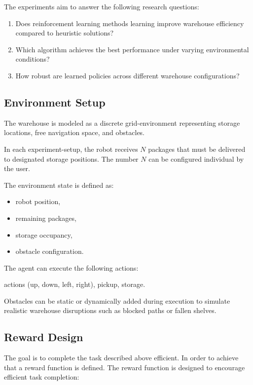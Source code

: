 \documentclass{article}
\begin{document}
The experiments aim to answer the following research questions:

\begin{enumerate}
    \item Does reinforcement learning methods learning improve warehouse efficiency compared to heuristic solutions?
    \item Which algorithm achieves the best performance under varying environmental conditions?
    \item How robust are learned policies across different warehouse configurations?
\end{enumerate}

\subsection{Environment Setup}

The warehouse is modeled as a discrete grid-environment representing storage locations, free navigation space, and obstacles.

In each experiment-setup, the robot receives $N$ packages that must be delivered to designated storage positions. The number $N$ can be configured individual by the user. 

The environment state is defined as:
\begin{itemize}
    \item robot position,
    \item remaining packages,
    \item storage occupancy,
    \item obstacle configuration.
\end{itemize}

The agent can execute the following actions:

\begin{itemize}
    \movement actions (up, down, left, right),
    \package pickup,
    \package storage.
\end{itemize}

Obstacles can be static or dynamically added during execution to simulate realistic warehouse disruptions such as blocked paths or fallen shelves.

\subsection{Reward Design}

The goal is to complete the task described above efficient.
In order to achieve that a reward function is defined. The reward function is designed to encourage efficient task completion:
\end{document}

